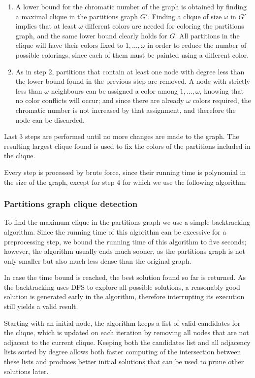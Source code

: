 \begin{enumerate}
	\item{A lower bound for the chromatic number of the graph is obtained by finding a maximal clique in the partitions graph $G'$. Finding a clique of size $\omega$ in $G'$ implies that at least $\omega$ different colors are needed for coloring the partitions graph, and the same lower bound clearly holds for $G$. All partitions in the clique will have their colors fixed to $1,\ldots,\omega$ in order to reduce the number of possible colorings, since each of them must be painted using a different color.}
	\item{As in step 2, partitions that contain at least one node with degree less than the lower bound found in the previous step are removed. A node with strictly less than $\omega$ neighbours can be assigned a color among $1,\ldots,\omega$, knowing that no color conflicts will occur; and since there are already $\omega$ colors required, the chromatic number is not increased by that assignment, and therefore the node can be discarded. }
\end{enumerate}

Last 3 steps are performed until no more changes are made to the graph. The resulting largest clique found is used to fix the colors of the partitions included in the clique. 

Every step is processed by brute force, since their running time is polynomial in the size of the graph, except for step 4 for which we use the following algorithm.

\subsubsection*{Partitions graph clique detection}

To find the maximum clique in the partitions graph we use a simple backtracking algorithm. Since the running time of this algorithm can be excessive for a preprocessing step, we bound the running time of this algorithm to five seconds; however, the algorithm usually ends much sooner, as the partitions graph is not only smaller but also much less dense than the original graph. 

In case the time bound is reached, the best solution found so far is returned. As the backtracking uses DFS to explore all possible solutions, a reasonably good solution is generated early in the algorithm, therefore interrupting its execution still yields a valid result.

Starting with an initial node, the algorithm keeps a list of valid candidates for the clique, which is updated on each iteration by removing all nodes that are not adjacent to the current clique. Keeping both the candidates list and all adjacency lists sorted by degree allows both faster computing of the intersection between these lists and produces better initial solutions that can be used to prune other solutions later.

